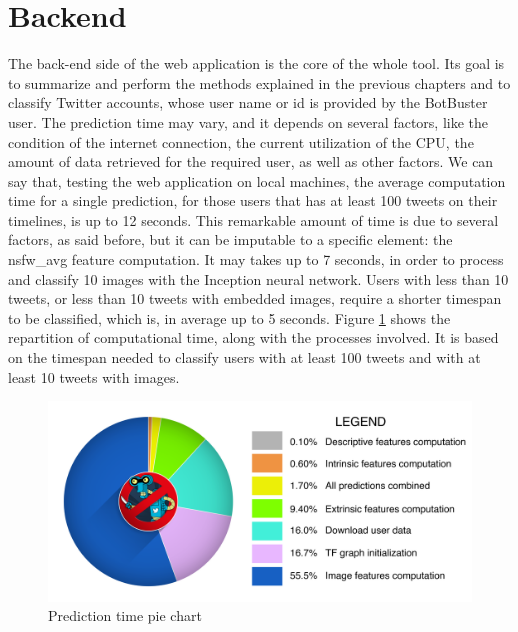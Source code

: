 \section{Backend}
The back-end side of the web application is the core of the whole tool. Its goal is to summarize and perform the methods explained in the previous chapters and to classify Twitter accounts, whose user name or id is provided by the BotBuster user.
The prediction time may vary, and it depends on several factors, like the condition of the internet connection, the current utilization of the CPU, the amount of data retrieved for the required user, as well as other factors.
We can say that, testing the web application on local machines, the average computation time for a single prediction, for those users that has at least 100 tweets on their timelines, is up to 12 seconds. This remarkable amount of time is due to several factors, as said before, but it can be imputable to a specific element: the nsfw\_avg feature computation. It may takes up to 7 seconds, in order to process and classify 10 images with the Inception neural network. Users with less than 10 tweets, or less than 10 tweets with embedded images, require a shorter timespan to be classified, which is, in average up to 5 seconds. Figure \ref{fig:pie} shows the repartition of computational time, along with the processes involved. It is based on the timespan needed to classify users with at least 100 tweets and with at least 10 tweets with images.

\begin{figure}[htp!]
	\begin{center}
		\includegraphics[width=\columnwidth]{chapter7/figure/time-pie.png}
	\end{center}
	\caption{Prediction time pie chart}
	\label{fig:pie}
\end{figure}

